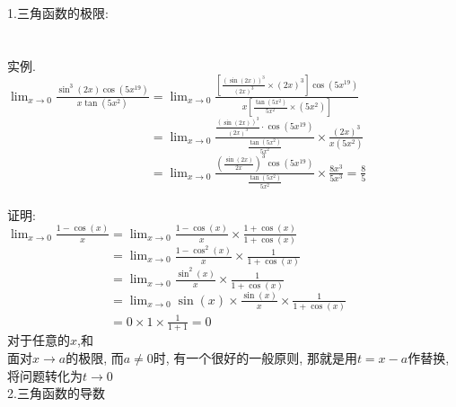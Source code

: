 \documentclass[UTF8, fontset=ubuntu]{ctexart}
\begin{document}
1.三角函数的极限:\\[2ex]
\\[2ex]
\\[2ex]
实例.\\
$\displaystyle\lim_{x\to 0}\frac{\sin^3(2x)\cos(5x^{19})}{x\tan(5x^2)}=\lim_{x\to 0}\frac{[\frac{(\sin(2x))^3}{(2x)^3}\times (2x)^3]\cos(5x^{19})}{x[\frac{\tan(5x^2)}{5x^2}\times (5x^2)]}$\\
$\displaystyle\phantom{\lim_{x\to 0}\frac{\sin^3(2x)\cos(5x^{19})}{x\tan(5x^2)}}=\lim_{x\to 0}\frac{\frac{(\sin(2x))^3}{(2x)^3}\cdot\cos(5x^{19})}{\frac{\tan(5x^2)}{5x^2}}\times\frac{(2x)^3}{x(5x^2)}$\\
$\displaystyle\phantom{\lim_{x\to 0}\frac{\sin^3(2x)\cos(5x^{19})}{x\tan(5x^2)}}=\lim_{x\to 0}\frac{(\frac{\sin(2x)}{2x})^3\cos(5x^{19})}{\frac{\tan(5x^2)}{5x^2}}\times\frac{8x^3}{5x^3}=\frac{8}{5}$\\[2ex]
\\[2ex]
证明:\\[2ex]
$\displaystyle\lim_{x\to 0}\frac{1-\cos(x)}{x}=\lim_{x\to 0}\frac{1-\cos(x)}{x}\times\frac{1+\cos(x)}{1+\cos(x)}$\\
$\displaystyle\phantom{\lim_{x\to 0}\frac{1-\cos(x)}{x}}=\lim_{x\to 0}\frac{1-\cos^2(x)}{x}\times\frac{1}{1+\cos(x)}$\\
$\displaystyle\phantom{\lim_{x\to 0}\frac{1-\cos(x)}{x}}=\lim_{x\to 0}\frac{\sin^2(x)}{x}\times\frac{1}{1+\cos(x)}$\\
$\displaystyle\phantom{\lim_{x\to 0}\frac{1-\cos(x)}{x}}=\lim_{x\to 0}\sin(x)\times\frac{\sin(x)}{x}\times\frac{1}{1+\cos(x)}$\\
$\displaystyle\phantom{\lim_{x\to 0}\frac{1-\cos(x)}{x}}=0\times 1\times\frac{1}{1+1}=0$\\[2ex]
对于任意的$x$,和\\[2ex]
面对$x\to a$的极限, 而$a\neq 0$时, 有一个很好的一般原则, 那就是用$t=x-a$作替换, 将问题转化为$t\to 0$\\[2ex]

2.三角函数的导数\\[2ex]
\\[2ex]
\\[2ex]
\\[2ex]
\\[2ex]
\\[2ex]
\\[2ex]
\end{document}
